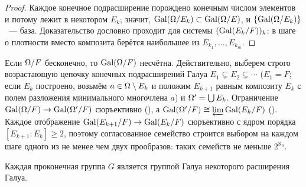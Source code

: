 \begin{proof}
Каждое конечное подрасширение порождено конечным числом элементов и потому лежит в некотором $E_k$; значит,
$\operatorname{Gal}(\Omega/E_k)\subset\operatorname{Gal}(\Omega/E)$, и $\{\operatorname{Gal}(\Omega/E_k)\}$~--- база. Доказательство  дословно проходит для системы
$(\operatorname{Gal}(E_k/F))_k$: в шаге о плотности вместо композита берётся наибольшее из $E_{k_1},\dots,E_{k_m}$.
\end{proof}

\begin{remark}[7.26b]
Если $\Omega/F$ бесконечно, то $\operatorname{Gal}(\Omega/F)$ несчётна. Действительно, выберем строго возрастающую цепочку конечных
подрасширений Галуа $E_1\subsetneq E_2\subsetneq\cdots$ ($E_1=F$; если $E_k$ построено, возьмём $a\in\Omega\setminus E_k$ и положим
$E_{k+1}$ равным композиту $E_k$ с полем разложения минимального многочлена $a$) и $\Omega'=\bigcup E_k$. Ограничение
$\operatorname{Gal}(\Omega/F)\to\operatorname{Gal}(\Omega'/F)$ сюръективно (), а $\operatorname{Gal}(\Omega'/F)\cong\varprojlim\operatorname{Gal}(E_k/F)$ (). Каждое отображение
$\operatorname{Gal}(E_{k+1}/F)\to\operatorname{Gal}(E_k/F)$ сюръективно с ядром порядка $[E_{k+1}:E_k]\ge2$, поэтому согласованное семейство строится
выбором на каждом шаге одного из не менее чем двух прообразов: таких семейств не меньше $2^{\aleph_0}$.
\end{remark}

\begin{proposition}[7.27]
Каждая проконечная группа $G$ является группой Галуа некоторого расширения Галуа.
\end{proposition}

